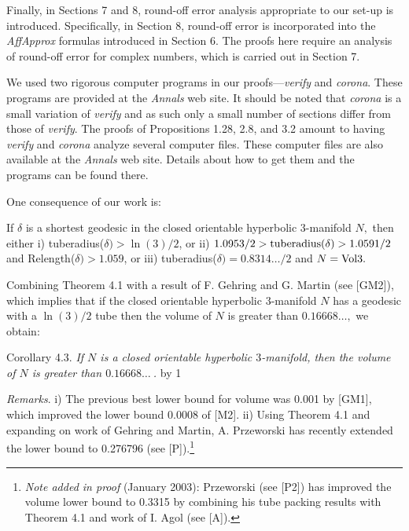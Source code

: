 Finally, in Sections 7 and 8, round-off error analysis appropriate to our 
set-up is introduced.  Specifically, in Section 8, round-off error is 
incorporated 
into the {\it AffApprox} formulas introduced in Section 6.  The proofs here 
require an analysis of round-off error for complex numbers, which is carried 
out in Section 7.

We used two rigorous computer programs in our proofs---{\it verify} and 
{\it corona}.  These programs are provided at the {\it Annals} web 
site.  It should be noted that {\it corona} is a small variation of {\it verify} 
and as such only a small number of sections differ from those of {\it verify}.  
The proofs of Propositions 1.28, 2.8, and 3.2 amount to having {\it verify} 
and {\it corona} analyze several computer files.  These computer files are 
also available at the {\it Annals} web site. Details about how to get 
them and the programs can be found there.
 
One consequence of our work is: 

 If $\delta$ is a shortest geodesic in
the closed orientable hyperbolic $3$\/{\rm -}\/manifold $N,$ then either
{\rm i)} {\rm tuberadius(}$\delta) > \ln(3)/2${\rm ,} or
{\rm ii)} $1.0953/2 > {\rm tuberadius}(\delta) > 1.0591/2$
and {\rm Relength(}$\delta) > 1.059${\rm ,} or
  {\rm iii)} {\rm tuberadius(}$\delta) = 0.8314\ldots/2$ and $N = {\rm Vol3}.$\pagebreak
\endproclaim
 

Combining Theorem 4.1 with a result of F. Gehring and G. Martin (see [GM2]), which implies that if the closed 
orientable hyperbolic $3$-manifold $N$ has a geodesic with a $\ln(3)/2$ tube
 then the volume of $N$ is greater than $0.16668\ldots,$ we obtain:

 {\elevensc Corollary 4.3.}  {\it If $N$ is a closed orientable hyperbolic 
$3$\/{\rm -}\/manifold{\rm ,} then
the volume of $N$ is greater than  $0.16668\ldots\ $.}
\advance\theoremcount by 1
 
{\it Remarks}.   i) The previous best lower bound for volume was 
0.001 by [GM1], which
improved the lower bound   0.0008 of [M2].
ii) Using Theorem 4.1 and expanding on work of Gehring and Martin, A. Przeworski has recently extended the lower bound 
to 0.276796 (see [P]).\footnote{{\it Note added in proof} (January 2003): Przeworski (see [P2]) has improved the volume
lower bound to 0.3315 by combining his tube packing results with Theorem 4.1 and work of I. Agol (see [A]).} 

